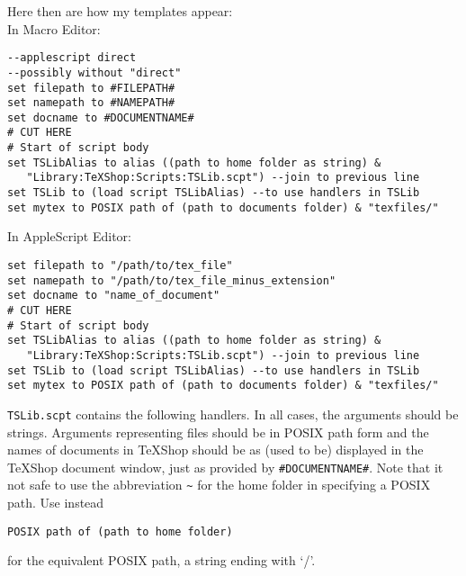 \documentclass[11pt]{amsart}
\begin{document}
Here then are how my templates appear:\\
In Macro Editor:
\begin{verbatim}
--applescript direct
--possibly without "direct"
set filepath to #FILEPATH#
set namepath to #NAMEPATH#
set docname to #DOCUMENTNAME#
# CUT HERE
# Start of script body
set TSLibAlias to alias ((path to home folder as string) &
   "Library:TeXShop:Scripts:TSLib.scpt") --join to previous line
set TSLib to (load script TSLibAlias) --to use handlers in TSLib
set mytex to POSIX path of (path to documents folder) & "texfiles/"
\end{verbatim}

In AppleScript Editor:
\begin{verbatim}
set filepath to "/path/to/tex_file"
set namepath to "/path/to/tex_file_minus_extension"
set docname to "name_of_document"
# CUT HERE
# Start of script body
set TSLibAlias to alias ((path to home folder as string) &
   "Library:TeXShop:Scripts:TSLib.scpt") --join to previous line
set TSLib to (load script TSLibAlias) --to use handlers in TSLib
set mytex to POSIX path of (path to documents folder) & "texfiles/"
\end{verbatim}

{\tt TSLib.scpt} contains the following handlers. In all cases, the arguments should be strings. Arguments representing files should be in POSIX path form and the names of documents in TeXShop should be as (used to be) displayed in the TeXShop document window, just as provided by \verb|#DOCUMENTNAME#|. Note that it not safe to use the abbreviation \verb|~| for the home folder in specifying a POSIX path. Use instead
\begin{verbatim}
POSIX path of (path to home folder)
\end{verbatim}
for the equivalent POSIX path, a string ending with `/'.
\end{document}
